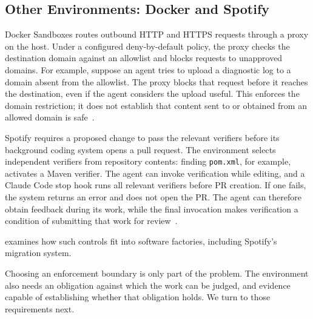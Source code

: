 \subsection{Other Environments: Docker and Spotify}\label{heading:example-docker}

Docker Sandboxes routes outbound HTTP and HTTPS requests through a proxy on the host. Under a configured deny-by-default policy, the proxy checks the destination domain against an allowlist and blocks requests to unapproved domains. For example, suppose an agent tries to upload a diagnostic log to a domain absent from the allowlist. The proxy blocks that request before it reaches the destination, even if the agent considers the upload useful. This enforces the domain restriction; it does not establish that content sent to or obtained from an allowed domain is safe~\citep{mikhalev2026untrusted}.

Spotify requires a proposed change to pass the relevant verifiers before its background coding system opens a pull request. The environment selects independent verifiers from repository contents: finding \texttt{pom.xml}, for example, activates a Maven verifier. The agent can invoke verification while editing, and a Claude Code stop hook runs all relevant verifiers before PR creation. If one fails, the system returns an error and does not open the PR. The agent can therefore obtain feedback during its work, while the final invocation makes verification a condition of submitting that work for review~\citep{charas2025feedback}.

 examines how such controls fit into software factories, including Spotify's migration system.



Choosing an enforcement boundary is only part of the problem. The environment also needs an obligation against which the work can be judged, and evidence capable of establishing whether that obligation holds. We turn to those requirements next.
